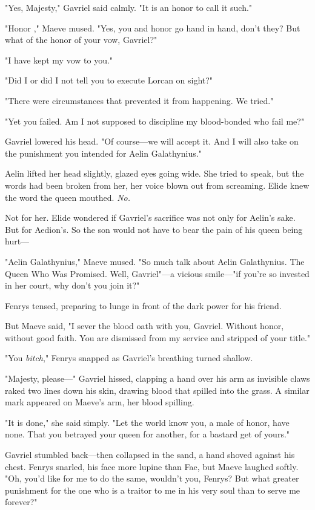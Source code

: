 "Yes, Majesty," Gavriel said calmly. "It is an honor to call it such."

"Honor  ," Maeve mused. "Yes, you and honor go hand in hand, don't they? But what of the honor of your vow, Gavriel?"

"I have kept my vow to you."

"Did I or did I not tell you to execute Lorcan on sight?"

"There were  circumstances that prevented it from happening. We tried."

"Yet you failed. Am I not supposed to discipline my blood-bonded who fail me?"

Gavriel lowered his head. "Of course---we will accept it. And I will also take on the punishment you intended for Aelin Galathynius."

Aelin lifted her head slightly, glazed eyes going wide. She tried to speak, but the words had been broken from her, her voice blown out from screaming. Elide knew the word the queen mouthed. \emph{No.}

Not for her. Elide wondered if Gavriel's sacrifice was not only for Aelin's sake. But for Aedion's. So the son would not have to bear the pain of his queen being hurt---

"Aelin Galathynius," Maeve mused. "So much talk about Aelin Galathynius. The Queen Who Was Promised. Well, Gavriel"---a vicious smile---"if you're so invested in her court, why don't you join it?"

Fenrys tensed, preparing to lunge in front of the dark power for his friend.

But Maeve said, "I sever the blood oath with you, Gavriel. Without honor, without good faith. You are dismissed from my service and stripped of your title."

"You \emph{bitch}," Fenrys snapped as Gavriel's breathing turned shallow.

"Majesty, please---" Gavriel hissed, clapping a hand over his arm as invisible claws raked two lines down his skin, drawing blood that spilled into the grass. A similar mark appeared on Maeve's arm, her blood spilling.

"It is done," she said simply. "Let the world know you, a male of honor, have none. That you betrayed your queen for another, for a bastard get of yours."

Gavriel stumbled back---then collapsed in the sand, a hand shoved against his chest. Fenrys snarled, his face more lupine than Fae, but Maeve laughed softly. "Oh, you'd like for me to do the same, wouldn't you, Fenrys? But what greater punishment for the one who is a traitor to me in his very soul than to serve me forever?"

